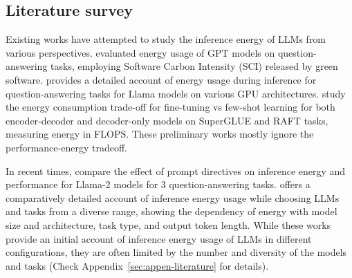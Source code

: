 \subsection{Literature survey}  Existing works have attempted to study the inference energy of LLMs from various perspectives. \citet{everman2023evaluating} evaluated energy usage of GPT models on question-answering tasks, employing Software Carbon Intensity (SCI) released by green software. \citet{samsi2023words} provides a detailed account of energy usage during inference for question-answering tasks for Llama models on various GPU architectures. \citet{liu2022few} study the energy consumption trade-off for fine-tuning vs few-shot learning for both encoder-decoder and decoder-only models on SuperGLUE and RAFT tasks, measuring energy in FLOPS. These preliminary works mostly ignore the performance-energy tradeoff. 

In recent times, \citet{li2024toward} compare the effect of prompt directives on inference energy and performance for Llama-2 models for 3 question-answering tasks. \citet{luccioni2024power} offers a comparatively detailed account of inference energy usage while choosing LLMs and tasks from a diverse range, showing the dependency of energy with model size and architecture, task type, and output token length. While these works provide an initial account of inference energy usage of LLMs in different configurations, they are often limited by the number and diversity of the models and tasks (Check Appendix~\ref{sec:appen-literature} for details).

